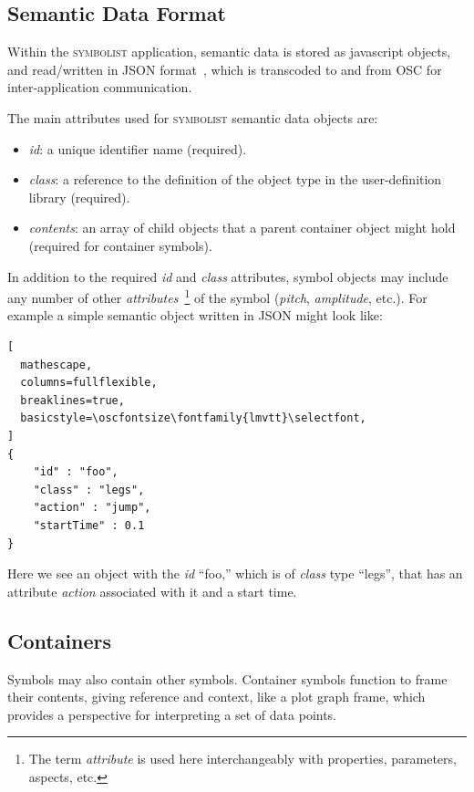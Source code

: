 \documentclass{article}
\def\symbolist{\textsc{symbolist}\xspace}
\def\oscfontsize{\footnotesize}
\begin{document}
\subsection{Semantic Data Format}\label{subsec:format}

Within the \symbolist application, semantic data is stored as javascript objects, and read/written in JSON format~\cite{crockford2012json}, which is transcoded to and from OSC for inter-application communication.

The main attributes used for \symbolist semantic data objects are:

\begin{itemize}\itemsep0pt 
\item \textit{id}: a unique identifier name (required).
\item \textit{class}: a reference to the definition of the object type in the user-definition library (required).
\item \textit{contents}: an array of child objects that a parent container object might hold (required for container symbols).
\end{itemize}

In addition to the required \textit{id} and \textit{class} attributes, symbol objects may include any number of other \textit{attributes}~\footnote{The term \textit{attribute} is used here interchangeably with properties, parameters, aspects, etc.} of the symbol (\textit{pitch}, \textit{amplitude}, etc.). For example a simple semantic object written in JSON might look like:

\begin{lstlisting}[
  mathescape,
  columns=fullflexible,
  breaklines=true,
  basicstyle=\oscfontsize\fontfamily{lmvtt}\selectfont,
]
{
    "id" : "foo",
    "class" : "legs",
    "action" : "jump",
    "startTime" : 0.1
}
\end{lstlisting}

\noindent
Here we see an object with the \textit{id} ``foo,'' which is of \textit{class} type ``legs'', that has an attribute \textit{action} associated with it and a start time.

\subsection{Containers}
Symbols may also contain other symbols. 
Container symbols function to frame their contents, giving reference and context, like a plot graph frame, which provides a perspective for interpreting a set of data points.
\end{document}
